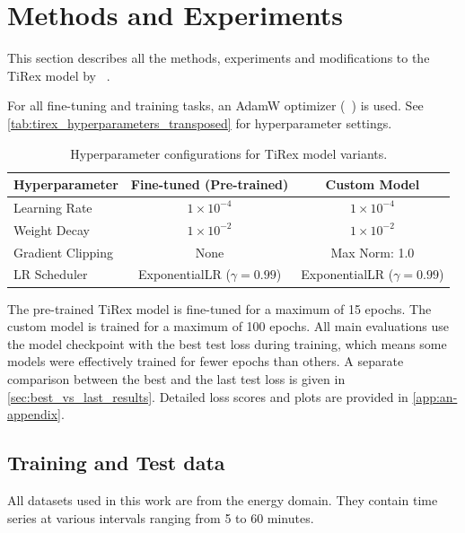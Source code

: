 \documentclass[a4paper,oneside,10pt,ngerman,english]{scrartcl}
\begin{document}
\section{Methods and Experiments}
\label{sec:methods}

This section describes all the methods, experiments and modifications to the TiRex model by \citeauthor{auer2025tirexzeroshotforecastinglong}~\cite{auer2025tirexzeroshotforecastinglong}.

For all fine-tuning and training tasks, an AdamW optimizer (\citeauthor{loshchilov2019decoupledweightdecayregularization}~\cite{loshchilov2019decoupledweightdecayregularization}) is used. See \autoref{tab:tirex_hyperparameters_transposed} for hyperparameter settings.

\begin{table}[htbp]
	\centering
	\caption{Hyperparameter configurations for TiRex model variants.}
	\label{tab:tirex_hyperparameters_transposed}
	\begin{tabular}{lcc}
		\toprule
		\textbf{Hyperparameter} & \textbf{Fine-tuned (Pre-trained)} & \textbf{Custom Model} \\
		\midrule
		Learning Rate     & $1 \times 10^{-4}$ & $1 \times 10^{-4}$ \\
		Weight Decay      & $1 \times 10^{-2}$ & $1 \times 10^{-2}$ \\
		Gradient Clipping & None               & Max Norm: 1.0 \\
		LR Scheduler      & ExponentialLR ($\gamma = 0.99$) & ExponentialLR ($\gamma = 0.99$) \\
		\bottomrule
	\end{tabular}
\end{table}

The pre-trained TiRex model is fine-tuned for a maximum of 15 epochs. The custom model is trained for a maximum of 100 epochs. All main evaluations use the model checkpoint with the best test loss during training, which means some models were effectively trained for fewer epochs than others. A separate comparison between the best and the last test loss is given in \autoref{sec:best_vs_last_results}. Detailed loss scores and plots are provided in \autoref{app:an-appendix}.

\subsection{Training and Test data}
\label{sec:data}
All datasets used in this work are from the energy domain. They contain time series at various intervals ranging from 5 to 60 minutes. 
\end{document}
